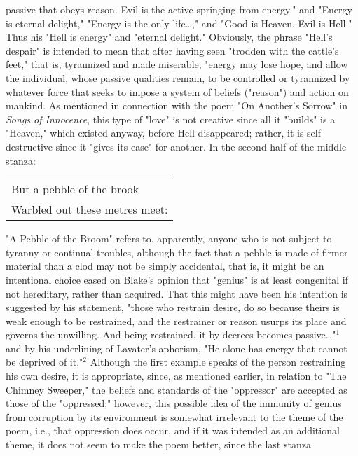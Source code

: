 \noindent passive that obeys reason. Evil is
the active springing from energy," and "Energy is eternal delight," "Energy is the only life\dots," and "Good is Heaven. Evil is Hell."
Thus his "Hell is energy" and "eternal delight." Obviously, the phrase "Hell's despair" is intended to mean
that after having seen "trodden with the cattle's feet," that is, tyrannized and made miserable, "energy may lose hope, and allow
the individual, whose passive qualities remain, to be controlled or tyrannized by whatever force 
that seeks to impose a system of beliefs ("reason") and action on mankind. As mentioned in connection
with the poem "On Another's Sorrow" in \textit{Songs of Innocence}, this type of "love" is not creative since
all it "builds" is a "Heaven," which existed anyway, before Hell disappeared; rather, it is self-destructive
since it "gives its ease" for another. In the second half of the middle stanza:\par
\begin{center}
	\begin{tabular}{l}
		But a pebble of the brook \\
		Warbled out these metres meet:
	\end{tabular}
\end{center}
\hspace*{5mm}"A Pebble of the Broom" refers to, apparently, anyone who is not subject to tyranny or continual troubles,
although the fact that a pebble is made of firmer material than a clod may not be simply accidental, that is, it
might be an intentional choice eased on Blake's opinion that "genius" is at least congenital if not
hereditary, rather than acquired. That this might have been his intention is suggested by his statement, "those who 
restrain desire, do so because theirs is weak enough to be restrained, and the restrainer or reason usurps
its place and governs the unwilling. And being restrained, it by decrees becomes passive\dots"$^{1}$ and by his underlining
of Lavater's aphorism, "He alone has energy that cannot be deprived of it."$^{2}$ Although the first example speaks
of the person restraining his own desire, it is appropriate, since, as mentioned earlier, in relation to "The Chimney Sweeper,"
the beliefs and standards of the "oppressor" are accepted as those of the "oppressed;" however, this possible idea of the immunity 
of genius from corruption by its environment is somewhat irrelevant to the theme of the poem, i.e., that oppression does occur,
and if it was intended as an additional theme, it does not seem to make the poem better, since the last stanza

